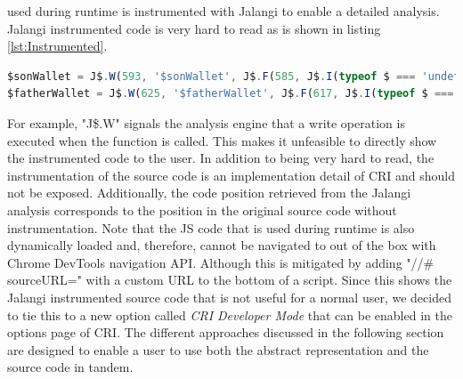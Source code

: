used during runtime is instrumented with Jalangi to enable a detailed analysis. Jalangi instrumented code is very hard to read as is shown in listing \ref{lst:Instrumented}.

\begin{lstlisting}[language=JavaScript, caption={Example of RxJS code.},label={lst:Instrumented}]
$sonWallet = J$.W(593, '$sonWallet', J$.F(585, J$.I(typeof $ === 'undefined' ? $ = J$.R(569, '$', undefined, true, true) : $ = J$.R(569, '$', $, true, true)), false)(J$.T(577, '#wallet-son', 21, false)), J$.I(typeof $sonWallet === 'undefined' ? undefined : $sonWallet), true, true);
$fatherWallet = J$.W(625, '$fatherWallet', J$.F(617, J$.I(typeof $ === 'undefined' ? $ = J$.R(601, '$', undefined, true, true) : $ = J$.R(601, '$', $, true, true)), false)(J$.T(609, '#wallet-father', 21, false)), J$.I(typeof $fatherWallet === 'undefined' ? undefined : $fatherWallet), true, true);
\end{lstlisting}

For example, "J\$.W" signals the analysis engine that a write operation is executed when the function is called. This makes it unfeasible to directly show the instrumented code to the user. In addition to being very hard to read, the instrumentation of the source code is an implementation detail of CRI and should not be exposed. Additionally, the code position retrieved from the Jalangi analysis corresponds to the position in the original source code without instrumentation. Note that the JS code that is used during runtime is also dynamically loaded and, therefore, cannot be navigated to out of the box with Chrome DevTools navigation API. Although this is mitigated by adding "//\# sourceURL=" with a custom URL to the bottom of a script. Since this shows the Jalangi instrumented source code that is not useful for a normal user, we decided to tie this to a new option called \emph{CRI Developer Mode} that can be enabled in the options page of CRI. The different approaches discussed in the following section are designed to enable a user to use both the abstract representation and the source code in tandem.
	
